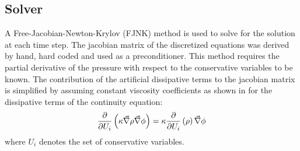 \subsection{Solver} \label{sec:solver}
A Free-Jacobian-Newton-Krylov (FJNK) method is used to solve for the solution at each time step. The jacobian matrix of the discretized equations was derived by hand, hard coded and used as a preconditioner. This method requires the partial derivative of the pressure with respect to the conservative variables to be known. The contribution of the artificial dissipative terms to the jacobian matrix is simplified by assuming constant viscosity coefficients as shown in  for the dissipative terms of the continuity equation:
\begin{equation}
\label{eq:jac_diss_term}
\frac{\partial}{\partial U_i} \left( \kappa \vec{\nabla} \rho \vec{\nabla} \phi \right) = \kappa \frac{\partial}{\partial U_i} \left( \rho \right) \vec{\nabla} \phi
\end{equation}  
where $U_i$ denotes the set of conservative variables.
